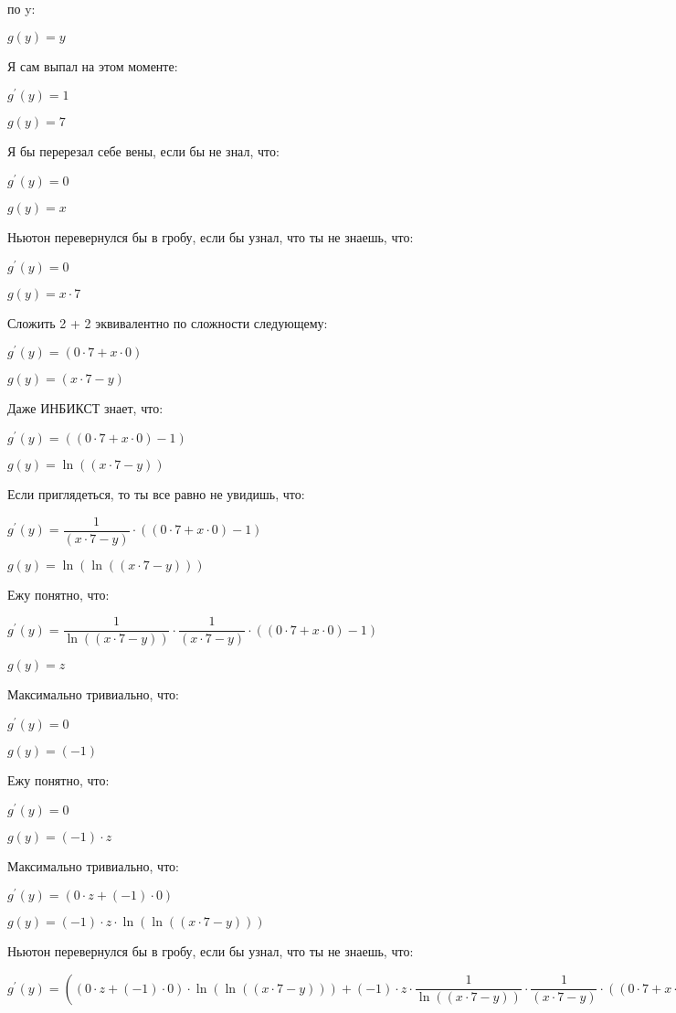 \documentclass[a4paper,12pt]{article}
\begin{document}
\begin{flushleft}
 по y:

$g(y) = y$

Я сам выпал на этом моменте:

$g^{'}(y) = 1$

$g(y) = 7$

Я бы перерезал себе вены, если бы не знал, что:

$g^{'}(y) = 0$

$g(y) = x$

Ньютон перевернулся бы в гробу, если бы узнал, что ты не знаешь, что:

$g^{'}(y) = 0$

$g(y) = x \cdot 7$

Сложить 2 + 2 эквивалентно по сложности следующему:

$g^{'}(y) = (0 \cdot 7+x \cdot 0)$

$g(y) = (x \cdot 7-y)$

Даже ИНБИКСТ знает, что:

$g^{'}(y) = ((0 \cdot 7+x \cdot 0)-1)$

$g(y) = \ln {((x \cdot 7-y))}$

Если приглядеться, то ты все равно не увидишь, что:

$g^{'}(y) =  \dfrac{1}{(x \cdot 7-y)}  \cdot ((0 \cdot 7+x \cdot 0)-1)$

$g(y) = \ln {(\ln {((x \cdot 7-y))})}$

Ежу понятно, что:

$g^{'}(y) =  \dfrac{1}{\ln {((x \cdot 7-y))}}  \cdot  \dfrac{1}{(x \cdot 7-y)}  \cdot ((0 \cdot 7+x \cdot 0)-1)$

$g(y) = z$

Максимально тривиально, что:

$g^{'}(y) = 0$

$g(y) = (-1)$

Ежу понятно, что:

$g^{'}(y) = 0$

$g(y) = (-1) \cdot z$

Максимально тривиально, что:

$g^{'}(y) = (0 \cdot z+(-1) \cdot 0)$

$g(y) = (-1) \cdot z \cdot \ln {(\ln {((x \cdot 7-y))})}$

Ньютон перевернулся бы в гробу, если бы узнал, что ты не знаешь, что:

$g^{'}(y) = ((0 \cdot z+(-1) \cdot 0) \cdot \ln {(\ln {((x \cdot 7-y))})}+(-1) \cdot z \cdot  \dfrac{1}{\ln {((x \cdot 7-y))}}  \cdot  \dfrac{1}{(x \cdot 7-y)}  \cdot ((0 \cdot 7+x \cdot 0)-1))$


\end{flushleft}
\end{document}
